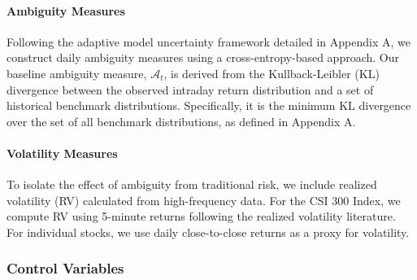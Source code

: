\documentclass[preprint,12pt,authoryear]{elsarticle}
\begin{document}
\paragraph{Ambiguity Measures}
Following the adaptive model uncertainty framework detailed in Appendix A, we construct daily ambiguity measures using a cross-entropy-based approach. Our baseline ambiguity measure, $\mathcal{A}_t$, is derived from the Kullback-Leibler (KL) divergence between the observed intraday return distribution and a set of historical benchmark distributions. Specifically, it is the minimum KL divergence over the set of all benchmark distributions, as defined in Appendix A.


\paragraph{Volatility Measures}
To isolate the effect of ambiguity from traditional risk, we include realized volatility (RV) calculated from high-frequency data. For the CSI 300 Index, we compute RV using 5-minute returns following the realized volatility literature. For individual stocks, we use daily close-to-close returns as a proxy for volatility.

\subsubsection{Control Variables}
\end{document}
